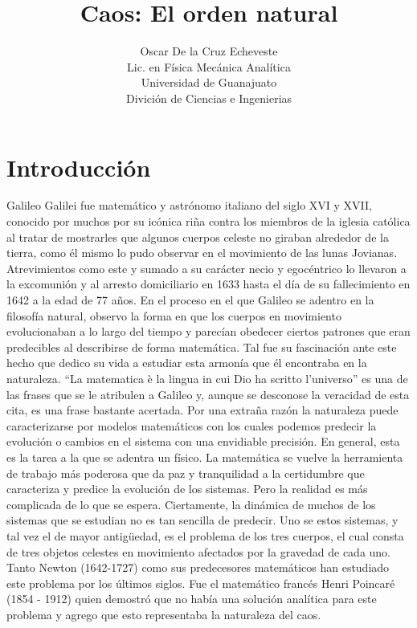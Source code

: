 \documentclass[11pt,twocolumn,spanish]{article}
\title{Caos: El orden natural}
\author{Oscar De la Cruz Echeveste\\
\small Lic. en Física  
  \small Mecánica Analítica\\
  \small Universidad de Guanajuato\\
  \small Divición de Ciencias e Ingenierias 
}
\theoremstyle{definition}
\theoremstyle{remark}
\begin{document}
\maketitle


\section{Introducción}
Galileo Galilei fue matemático y astrónomo italiano del siglo XVI y XVII, conocido por muchos por su icónica riña contra los miembros de la iglesia católica al tratar de mostrarles que algunos cuerpos celeste no giraban alrededor de la tierra, como él mismo lo pudo observar en el movimiento de las lunas Jovianas. Atrevimientos como este y sumado a su carácter necio y egocéntrico lo llevaron a la excomunión y al arresto domiciliario en 1633 hasta el día de su fallecimiento en 1642 a la edad de 77 años. En el proceso en el que Galileo se adentro en la filosofía natural, observo la forma en que los cuerpos en movimiento evolucionaban a lo largo del tiempo y parecían obedecer ciertos patrones que eran predecibles al describirse de forma matemática. Tal fue su fascinación ante este hecho que dedico su vida a estudiar esta armonía que él encontraba en la naturaleza. “La matematica è la lingua in cui Dio ha scritto l'universo” es una de las frases que se le atribulen a Galileo y, aunque se desconose la veracidad de esta cita, es una frase bastante acertada. Por una extraña razón la naturaleza puede caracterizarse por modelos matemáticos con los cuales podemos predecir la evolución o cambios en el sistema con una envidiable precisión. En general, esta es la tarea a la que se adentra un físico. La matemática se vuelve la herramienta de trabajo más poderosa que da paz y tranquilidad a la certidumbre que caracteriza y predice la evolución de los sistemas. Pero la realidad es más complicada de lo que se espera. Ciertamente, la dinámica de muchos de los sistemas que se estudian no es tan sencilla de predecir. Uno se estos sistemas, y tal vez el de mayor antigüedad, es el problema de los tres cuerpos, el cual consta de tres objetos celestes en movimiento afectados por la gravedad de cada uno. Tanto Newton (1642-1727) como sus predecesores matemáticos han estudiado este problema por los últimos siglos. Fue el matemático francés Henri Poincaré (1854 - 1912) quien demostró que no había una solución analítica para este problema y agrego que esto representaba la naturaleza del caos. 
\end{document}
